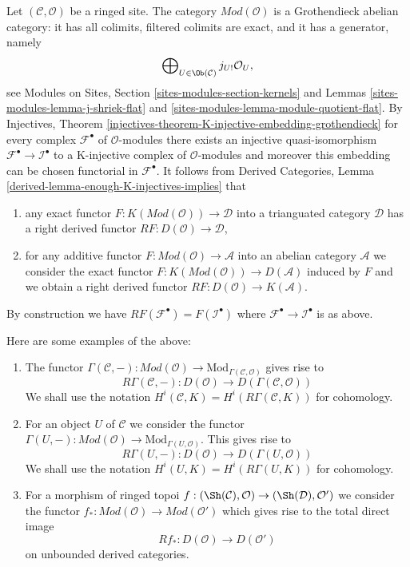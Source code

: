 \noindent
Let $(\mathcal{C}, \mathcal{O})$ be a ringed site.
The category $\textit{Mod}(\mathcal{O})$ is a Grothendieck
abelian category: it has all colimits,
filtered colimits are exact, and it has a generator, namely
$$
\bigoplus\nolimits_{U \in \Ob(\mathcal{C})} j_{U!}\mathcal{O}_U,
$$
see Modules on Sites, Section \ref{sites-modules-section-kernels} and
Lemmas \ref{sites-modules-lemma-j-shriek-flat} and
\ref{sites-modules-lemma-module-quotient-flat}.
By Injectives, Theorem
\ref{injectives-theorem-K-injective-embedding-grothendieck}
for every complex $\mathcal{F}^\bullet$ of $\mathcal{O}$-modules
there exists an injective quasi-isomorphism
$\mathcal{F}^\bullet \to \mathcal{I}^\bullet$ to a K-injective complex
of $\mathcal{O}$-modules and moreover this embedding can be chosen
functorial in $\mathcal{F}^\bullet$. It follows from
Derived Categories, Lemma \ref{derived-lemma-enough-K-injectives-implies}
that
\begin{enumerate}
\item any exact functor $F : K(\textit{Mod}(\mathcal{O})) \to \mathcal{D}$
into a trianguated category $\mathcal{D}$ has a right derived functor
$RF : D(\mathcal{O}) \to \mathcal{D}$,
\item for any additive functor
$F : \textit{Mod}(\mathcal{O}) \to \mathcal{A}$
into an abelian category $\mathcal{A}$ we consider the exact functor
$F : K(\textit{Mod}(\mathcal{O})) \to D(\mathcal{A})$ induced by $F$
and we obtain a right derived functor
$RF : D(\mathcal{O}) \to K(\mathcal{A})$.
\end{enumerate}
By construction we have $RF(\mathcal{F}^\bullet) = F(\mathcal{I}^\bullet)$
where $\mathcal{F}^\bullet \to \mathcal{I}^\bullet$ is as above.

\medskip\noindent
Here are some examples of the above:
\begin{enumerate}
\item The functor $\Gamma(\mathcal{C}, -) : \textit{Mod}(\mathcal{O}) \to
\text{Mod}_{\Gamma(\mathcal{C}, \mathcal{O})}$ gives rise to
$$
R\Gamma(\mathcal{C}, -) :
D(\mathcal{O})
\longrightarrow
D(\Gamma(\mathcal{C}, \mathcal{O}))
$$
We shall use the notation
$H^i(\mathcal{C}, K) = H^i(R\Gamma(\mathcal{C}, K))$ for cohomology.
\item For an object $U$ of $\mathcal{C}$ we consider the functor
$\Gamma(U, -) : \textit{Mod}(\mathcal{O}) \to
\text{Mod}_{\Gamma(U, \mathcal{O})}$. This gives rise to
$$
R\Gamma(U, -) : D(\mathcal{O}) \to D(\Gamma(U, \mathcal{O}))
$$
We shall use the notation
$H^i(U, K) = H^i(R\Gamma(U, K))$ for cohomology.
\item For a morphism of ringed topoi
$f : (\Sh(\mathcal{C}), \mathcal{O}) \to (\Sh(\mathcal{D}), \mathcal{O}')$
we consider the functor
$f_* : \textit{Mod}(\mathcal{O}) \to \textit{Mod}(\mathcal{O}')$
which gives rise to the total direct image
$$
Rf_* : D(\mathcal{O}) \longrightarrow D(\mathcal{O}')
$$
on unbounded derived categories.
\end{enumerate}

